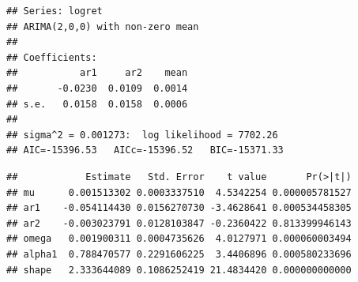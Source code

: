 \documentclass[
]{book}
\newenvironment{Shaded}{\begin{snugshade}}{\end{snugshade}}
\newcommand{\AttributeTok}[1]{\textcolor[rgb]{0.13,0.29,0.53}{#1}}
\newcommand{\CommentTok}[1]{\textcolor[rgb]{0.56,0.35,0.01}{\textit{#1}}}
\newcommand{\DecValTok}[1]{\textcolor[rgb]{0.00,0.00,0.81}{#1}}
\newcommand{\FunctionTok}[1]{\textcolor[rgb]{0.13,0.29,0.53}{\textbf{#1}}}
\newcommand{\NormalTok}[1]{#1}
\newcommand{\OtherTok}[1]{\textcolor[rgb]{0.56,0.35,0.01}{#1}}
\newcommand{\SpecialCharTok}[1]{\textcolor[rgb]{0.81,0.36,0.00}{\textbf{#1}}}
\newcommand{\StringTok}[1]{\textcolor[rgb]{0.31,0.60,0.02}{#1}}
\begin{document}
\begin{verbatim}
## Series: logret 
## ARIMA(2,0,0) with non-zero mean 
## 
## Coefficients:
##           ar1     ar2    mean
##       -0.0230  0.0109  0.0014
## s.e.   0.0158  0.0158  0.0006
## 
## sigma^2 = 0.001273:  log likelihood = 7702.26
## AIC=-15396.53   AICc=-15396.52   BIC=-15371.33
\end{verbatim}

\begin{Shaded}
\end{Shaded}

\begin{verbatim}
##            Estimate   Std. Error    t value       Pr(>|t|)
## mu      0.001513302 0.0003337510  4.5342254 0.000005781527
## ar1    -0.054114430 0.0156270730 -3.4628641 0.000534458305
## ar2    -0.003023791 0.0128103847 -0.2360422 0.813399946143
## omega   0.001900311 0.0004735626  4.0127971 0.000060003494
## alpha1  0.788470577 0.2291606225  3.4406896 0.000580233696
## shape   2.333644089 0.1086252419 21.4834420 0.000000000000
\end{verbatim}
\end{document}

